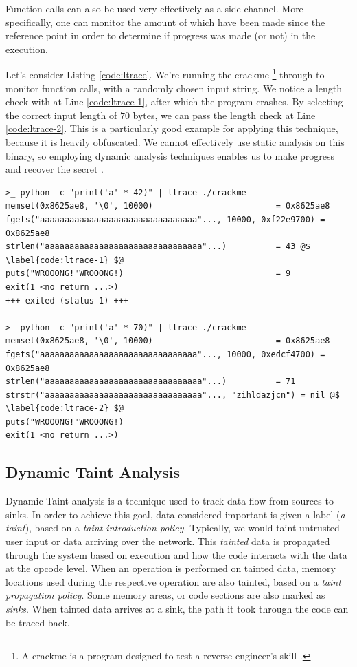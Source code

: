 Function calls can also be used very effectively as a side-channel. More specifically, one can monitor the amount of  which have been made since the reference point in order to determine if progress was made (or not) in the execution. 

Let's consider Listing \ref{code:ltrace}. We're running the crackme \footnote{A crackme is a program designed to test a reverse engineer's skill \cite{crackme}.} through  to monitor function calls, with a randomly chosen input string. We notice a length check with  at Line \ref{code:ltrace-1}, after which the program crashes. By selecting the correct input length of $70$ bytes, we can pass the length check at Line \ref{code:ltrace-2}. This  is a particularly good example for applying this technique, because it is heavily obfuscated. We cannot effectively use static analysis on this binary, so employing dynamic analysis techniques enables us to make progress and recover the secret \cite{crusu_relabs}.

\begin{lstlisting}[caption={ltrace (``a library call tracer'') output of an obfuscated crackme. One can observe a length check in the first execution, and different output when an input of the expected length is provided.}, label={code:ltrace}]
>_ python -c "print('a' * 42)" | ltrace ./crackme
memset(0x8625ae8, '\0', 10000)                         = 0x8625ae8
fgets("aaaaaaaaaaaaaaaaaaaaaaaaaaaaaaaa"..., 10000, 0xf22e9700) = 0x8625ae8
strlen("aaaaaaaaaaaaaaaaaaaaaaaaaaaaaaaa"...)          = 43 @$ \label{code:ltrace-1} $@
puts("WROOONG!"WROOONG!)                               = 9
exit(1 <no return ...>)
+++ exited (status 1) +++

>_ python -c "print('a' * 70)" | ltrace ./crackme
memset(0x8625ae8, '\0', 10000)                         = 0x8625ae8
fgets("aaaaaaaaaaaaaaaaaaaaaaaaaaaaaaaa"..., 10000, 0xedcf4700) = 0x8625ae8
strlen("aaaaaaaaaaaaaaaaaaaaaaaaaaaaaaaa"...)          = 71
strstr("aaaaaaaaaaaaaaaaaaaaaaaaaaaaaaaa"..., "zihldazjcn") = nil @$ \label{code:ltrace-2} $@
puts("WROOONG!"WROOONG!)
exit(1 <no return ...>)
\end{lstlisting}

\subsection{Dynamic Taint Analysis}

Dynamic Taint analysis is a technique used to track data flow from sources to sinks. In order to achieve this goal, data considered important is given a label (\emph{a taint}), based on a \emph{taint introduction policy}. Typically, we would taint untrusted user input or data arriving over the network. This \emph{tainted} data is propagated through the system based on execution and how the code interacts with the data at the opcode level. When an operation is performed on tainted data, memory locations used during the respective operation are also tainted, based on a \emph{taint propagation policy}. Some memory areas, or code sections are also marked as \emph{sinks}. When tainted data arrives at a sink, the path it took through the code can be traced back. 

